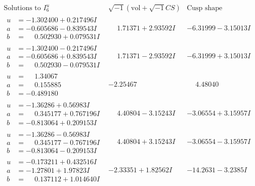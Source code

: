 \documentclass[1p]{elsarticle_modified}
\theoremstyle{definition}
\newcommand{\I}{\sqrt{-1}}
\begin{document}
$$\begin{array}{c|c|c}  
\text{Solutions to }I^u_{6}& \I (\text{vol} + \sqrt{-1}CS) & \text{Cusp shape}\\
 \hline 
\begin{aligned}
u &= -1.302400 + 0.217496 I \\
a &= -0.605686 - 0.839543 I \\
b &= \phantom{-}0.502930 + 0.079531 I\end{aligned}
 & \phantom{-}1.71371 + 2.93592 I & -6.31999 - 3.15013 I \\ \hline\begin{aligned}
u &= -1.302400 - 0.217496 I \\
a &= -0.605686 + 0.839543 I \\
b &= \phantom{-}0.502930 - 0.079531 I\end{aligned}
 & \phantom{-}1.71371 - 2.93592 I & -6.31999 + 3.15013 I \\ \hline\begin{aligned}
u &= \phantom{-}1.34067\phantom{ +0.000000I} \\
a &= \phantom{-}0.155885\phantom{ +0.000000I} \\
b &= -0.489180\phantom{ +0.000000I}\end{aligned}
 & -2.25467\phantom{ +0.000000I} & \phantom{-}4.48040\phantom{ +0.000000I} \\ \hline\begin{aligned}
u &= -1.36286 + 0.56983 I \\
a &= \phantom{-}0.345177 + 0.767196 I \\
b &= -0.813064 + 0.209153 I\end{aligned}
 & \phantom{-}4.40804 - 3.15243 I & -3.06554 + 3.15957 I \\ \hline\begin{aligned}
u &= -1.36286 - 0.56983 I \\
a &= \phantom{-}0.345177 - 0.767196 I \\
b &= -0.813064 - 0.209153 I\end{aligned}
 & \phantom{-}4.40804 + 3.15243 I & -3.06554 - 3.15957 I \\ \hline\begin{aligned}
u &= -0.173211 + 0.432516 I \\
a &= -1.27801 + 1.97823 I \\
b &= \phantom{-}0.137112 + 1.014640 I\end{aligned}
 & -2.33351 + 1.82562 I & -14.2631 - 3.2385 I \\ \hline\begin{aligned}

\end{aligned}
\end{array}$$
\end{document}
